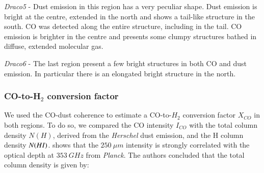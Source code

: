 \documentclass[traditabstract]{aa}
\begin{document}
\noindent \textit{Draco5} - Dust emission in this region has a very peculiar shape. Dust emission is bright at the centre, extended in the north and shows a tail-like structure in the south. CO was detected along the entire structure, including in the tail. CO emission is brighter in the centre and presents some clumpy structures bathed in diffuse, extended molecular gas.
\medskip

\noindent \textit{Draco6} - The last region present a few bright structures in both CO and dust emission. In particular there is an elongated bright structure in the north.


      \subsubsection{CO-to-H$_2$ conversion factor}

   We used the CO-dust coherence to estimate a CO-to-$H_2$ conversion factor $X_{CO}$ in both regions. To do so, we compared the CO intensity $I_{CO}$ with the total column density $N(H)$, derived from the \emph{Herschel} dust emission, and the H column density $N(H\rmnum{1})$. \cite{MAMD_2017b} shows that the $250\: \mu m$ intensity is strongly correlated with the optical depth at $353\: GHz$ from \emph{Planck}. The authors concluded that the total column density is given by:
\end{document}
